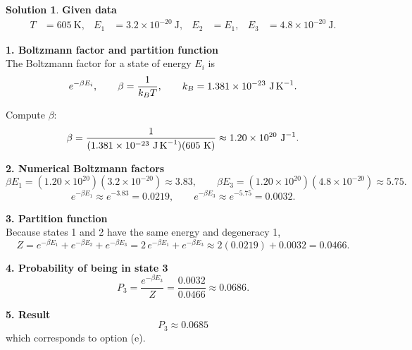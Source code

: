 \documentclass[12pt]{article}
\theoremstyle{definition} %
\newtheorem{solution}{Solution}
\theoremstyle{plain} %
\begin{document}
  \begin{solution}
    \textbf{Given data}\\
    \begin{align*}
    T &= 605\ \text{K}, &
    E_1 &= 3.2\times10^{-20}\ \text{J}, &
    E_2 &= E_1, &
    E_3 &= 4.8\times10^{-20}\ \text{J}.
    \end{align*}
    
    \textbf{1.  Boltzmann factor and partition function}\\
    The Boltzmann factor for a state of energy \(E_i\) is
    \[
    e^{-\beta E_i},\qquad 
    \beta=\frac1{k_B T},\qquad k_B = 1.381\times10^{-23}\ \text{J\,K}^{-1}.
    \]
    
    Compute \(\beta\):
    \[
    \beta = \frac1{(1.381\times10^{-23}\ \text{J\,K}^{-1})(605\ \text{K})}
           \approx 1.20\times10^{20}\ \text{J}^{-1}.
    \]
    
    \textbf{2.  Numerical Boltzmann factors}\\
    \[
    \beta E_1 = (1.20\times10^{20})(3.2\times10^{-20}) \approx 3.83,
    \qquad
    \beta E_3 = (1.20\times10^{20})(4.8\times10^{-20}) \approx 5.75.
    \]
    \[
    e^{-\beta E_1}\approx e^{-3.83}=0.0219,\qquad
    e^{-\beta E_3}\approx e^{-5.75}=0.0032.
    \]
    
    \textbf{3.  Partition function}\\
    Because states 1 and 2 have the same energy and degeneracy 1,
    \[
    Z = e^{-\beta E_1}+e^{-\beta E_2}+e^{-\beta E_3}
      = 2\,e^{-\beta E_1}+e^{-\beta E_3}
      \approx 2(0.0219)+0.0032 = 0.0466.
    \]
    
    \textbf{4.  Probability of being in state 3}\\
    \[
    P_3 = \frac{e^{-\beta E_3}}{Z}
         = \frac{0.0032}{0.0466}
         \approx 0.0686.
    \]
    
    \textbf{5.  Result}\\
    \[
    \boxed{P_3 \approx 0.0685}
    \]
    which corresponds to option (e).
    \end{solution}
\end{document}
